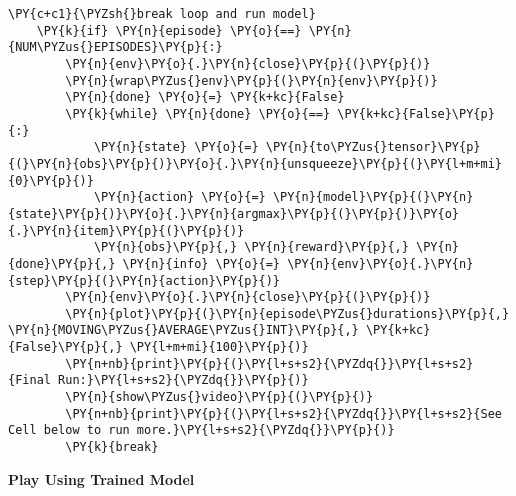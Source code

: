 \begin{tcolorbox}[breakable, size=fbox, boxrule=1pt, pad at break*=1mm,colback=cellbackground, colframe=cellborder]
\begin{Verbatim}[commandchars=\\\{\}]
    \PY{c+c1}{\PYZsh{}break loop and run model}
    \PY{k}{if} \PY{n}{episode} \PY{o}{==} \PY{n}{NUM\PYZus{}EPISODES}\PY{p}{:}
        \PY{n}{env}\PY{o}{.}\PY{n}{close}\PY{p}{(}\PY{p}{)}
        \PY{n}{wrap\PYZus{}env}\PY{p}{(}\PY{n}{env}\PY{p}{)}
        \PY{n}{done} \PY{o}{=} \PY{k+kc}{False}   
        \PY{k}{while} \PY{n}{done} \PY{o}{==} \PY{k+kc}{False}\PY{p}{:}
            \PY{n}{state} \PY{o}{=} \PY{n}{to\PYZus{}tensor}\PY{p}{(}\PY{n}{obs}\PY{p}{)}\PY{o}{.}\PY{n}{unsqueeze}\PY{p}{(}\PY{l+m+mi}{0}\PY{p}{)}
            \PY{n}{action} \PY{o}{=} \PY{n}{model}\PY{p}{(}\PY{n}{state}\PY{p}{)}\PY{o}{.}\PY{n}{argmax}\PY{p}{(}\PY{p}{)}\PY{o}{.}\PY{n}{item}\PY{p}{(}\PY{p}{)}
            \PY{n}{obs}\PY{p}{,} \PY{n}{reward}\PY{p}{,} \PY{n}{done}\PY{p}{,} \PY{n}{info} \PY{o}{=} \PY{n}{env}\PY{o}{.}\PY{n}{step}\PY{p}{(}\PY{n}{action}\PY{p}{)}
        \PY{n}{env}\PY{o}{.}\PY{n}{close}\PY{p}{(}\PY{p}{)}
        \PY{n}{plot}\PY{p}{(}\PY{n}{episode\PYZus{}durations}\PY{p}{,} \PY{n}{MOVING\PYZus{}AVERAGE\PYZus{}INT}\PY{p}{,} \PY{k+kc}{False}\PY{p}{,} \PY{l+m+mi}{100}\PY{p}{)}
        \PY{n+nb}{print}\PY{p}{(}\PY{l+s+s2}{\PYZdq{}}\PY{l+s+s2}{Final Run:}\PY{l+s+s2}{\PYZdq{}}\PY{p}{)}
        \PY{n}{show\PYZus{}video}\PY{p}{(}\PY{p}{)}
        \PY{n+nb}{print}\PY{p}{(}\PY{l+s+s2}{\PYZdq{}}\PY{l+s+s2}{See Cell below to run more.}\PY{l+s+s2}{\PYZdq{}}\PY{p}{)}
        \PY{k}{break}
\end{Verbatim}
\end{tcolorbox}

    \textbf{Play Using Trained Model}

